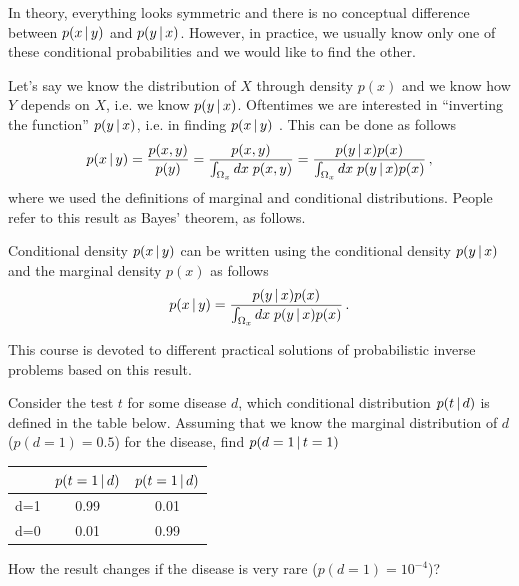 In theory, everything looks symmetric and there is no conceptual difference between $p(x\,|\, y)$ and $p(y\,|\, x)$.
However, in practice, we usually know only one of these conditional probabilities and we would like to find the other.

Let's say we know the distribution of $X$ through density $p(x)$ and we know how $Y$ depends on $X$, i.e. we know $p(y\,|\, x)$.
Oftentimes we are interested in ``inverting the function'' $p(y\,|\, x)$, i.e. in finding $p(x\,|\, y)$ .
This can be done as follows
\begin{align}
    p(x\,|\, y) = \frac{p(x,y)}{p(y)} = \frac{p(x,y)}{\int_{\Omega_x} dx\; p(x,y)} = \frac{p(y \,|\, x)p(x)}{\int_{\Omega_x} dx\; p(y \,|\, x)p(x)}\,,
\end{align}
where we used the definitions of marginal and conditional distributions.
People refer to this result as Bayes' theorem, as follows.
\begin{theorem}
\label{th:bayes}
    Conditional density $p(x\,|\, y)$ can be written using the conditional density $p(y\,|\, x)$ and the marginal density $p(x)$ as follows
    \begin{align}
        p(x\,|\, y) = \frac{p(y\,|\, x)p(x)}{\int_{\Omega_x} dx\; p(y\,|\, x)p(x)}\,.
    \end{align}
\end{theorem}
This course is devoted to different practical solutions of probabilistic inverse problems based on this result.

\begin{exercise}
    Consider the test $t$ for some disease $d$, which conditional distribution $p(t\,|\, d)$ is defined in the table below. Assuming that we know the marginal distribution of $d$ ($p(d=1) = 0.5$) for the disease, find $p(d = 1\,|\, t = 1)$
    \begin{center}
    \begin{tabular}{c|cc}
         & $p(t = 1\,|\, d)$ & $p(t = 1\,|\, d)$  \\
        \midrule
        d=1 & 0.99 & 0.01 \\
        d=0 & 0.01 & 0.99
    \end{tabular}
    \end{center}
    How the result changes if the disease is very rare ($p(d=1) = 10^{-4}$)?
\end{exercise}

